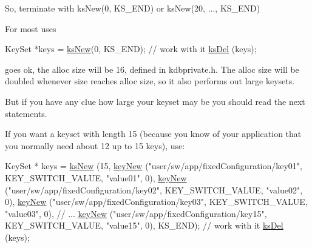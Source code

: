 So, terminate with ks\-New(0, K\-S\-\_\-\-E\-N\-D) or ks\-New(20, ..., K\-S\-\_\-\-E\-N\-D)

For most uses 
\begin{DoxyCode}
KeySet *keys = \hyperlink{group__keyset_ga671e1aaee3ae9dc13b4834a4ddbd2c3c}{ksNew}(0, KS\_END);
\textcolor{comment}{// work with it}
\hyperlink{group__keyset_ga27e5c16473b02a422238c8d970db7ac8}{ksDel} (keys);
\end{DoxyCode}
 goes ok, the alloc size will be 16, defined in kdbprivate.\-h. The alloc size will be doubled whenever size reaches alloc size, so it also performs out large keysets.

But if you have any clue how large your keyset may be you should read the next statements.

If you want a keyset with length 15 (because you know of your application that you normally need about 12 up to 15 keys), use\-: 
\begin{DoxyCode}
KeySet * keys = \hyperlink{group__keyset_ga671e1aaee3ae9dc13b4834a4ddbd2c3c}{ksNew} (15,
        \hyperlink{group__key_gad23c65b44bf48d773759e1f9a4d43b89}{keyNew} (\textcolor{stringliteral}{"user/sw/app/fixedConfiguration/key01"}, KEY\_SWITCH\_VALUE,
       \textcolor{stringliteral}{"value01"}, 0),
        \hyperlink{group__key_gad23c65b44bf48d773759e1f9a4d43b89}{keyNew} (\textcolor{stringliteral}{"user/sw/app/fixedConfiguration/key02"}, KEY\_SWITCH\_VALUE,
       \textcolor{stringliteral}{"value02"}, 0),
        \hyperlink{group__key_gad23c65b44bf48d773759e1f9a4d43b89}{keyNew} (\textcolor{stringliteral}{"user/sw/app/fixedConfiguration/key03"}, KEY\_SWITCH\_VALUE,
       \textcolor{stringliteral}{"value03"}, 0),
        \textcolor{comment}{// ...}
        \hyperlink{group__key_gad23c65b44bf48d773759e1f9a4d43b89}{keyNew} (\textcolor{stringliteral}{"user/sw/app/fixedConfiguration/key15"}, KEY\_SWITCH\_VALUE,
       \textcolor{stringliteral}{"value15"}, 0),
        KS\_END);
\textcolor{comment}{// work with it}
\hyperlink{group__keyset_ga27e5c16473b02a422238c8d970db7ac8}{ksDel} (keys);
\end{DoxyCode}


